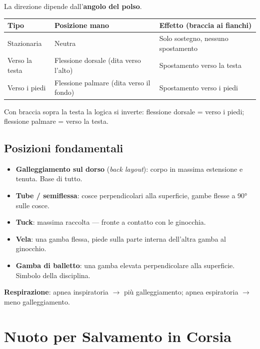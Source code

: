 \documentclass[12pt, a4paper]{article}
\begin{document}
La direzione dipende dall'\textbf{angolo del polso}.

\begin{tabularx}{\textwidth}{lXX}
\toprule
\rowcolor{light} \textbf{Tipo} & \textbf{Posizione mano} & \textbf{Effetto (braccia ai fianchi)} \\
\midrule
Stazionaria & Neutra & Solo sostegno, nessuno spostamento \\
Verso la testa & Flessione dorsale (dita verso l'alto) & Spostamento verso la testa \\
Verso i piedi & Flessione palmare (dita verso il fondo) & Spostamento verso i piedi \\
\bottomrule
\end{tabularx}

\begin{quotebox}
Con braccia sopra la testa la logica si inverte: flessione dorsale = verso i piedi; flessione palmare = verso la testa.
\end{quotebox}

\subsection{Posizioni fondamentali}

\begin{itemize}
  \item \textbf{Galleggiamento sul dorso} (\textit{back layout}): corpo in massima estensione e tenuta. Base di tutto.
  \item \textbf{Tube / semiflessa}: cosce perpendicolari alla superficie, gambe flesse a 90° sulle cosce.
  \item \textbf{Tuck}: massima raccolta --- fronte a contatto con le ginocchia.
  \item \textbf{Vela}: una gamba flessa, piede sulla parte interna dell'altra gamba al ginocchio.
  \item \textbf{Gamba di balletto}: una gamba elevata perpendicolare alla superficie. Simbolo della disciplina.
\end{itemize}

\textbf{Respirazione}: apnea inspiratoria $\rightarrow$ più galleggiamento; apnea espiratoria $\rightarrow$ meno galleggiamento.

\section{Nuoto per Salvamento in Corsia}
\end{document}
